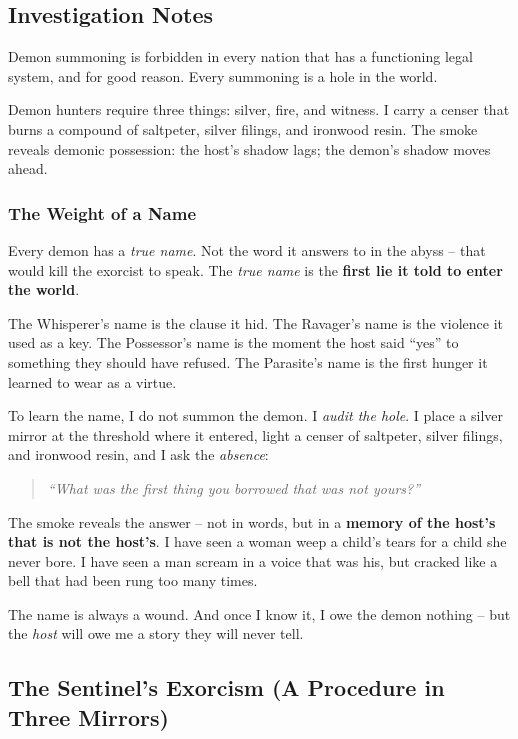 \subsection{Investigation Notes}

Demon summoning is forbidden in every nation that has a functioning legal system, and for good reason. Every summoning is a hole in the world.

Demon hunters require three things: silver, fire, and witness. I carry a censer that burns a compound of saltpeter, silver filings, and ironwood resin. The smoke reveals demonic possession: the host's shadow lags; the demon's shadow moves ahead.

\subsubsection{The Weight of a Name}

Every demon has a \emph{true name}. Not the word it answers to in the abyss -- that would kill the exorcist to speak. The \emph{true name} is the \textbf{first lie it told to enter the world}.  

The Whisperer's name is the clause it hid. The Ravager's name is the violence it used as a key. The Possessor's name is the moment the host said ``yes'' to something they should have refused. The Parasite's name is the first hunger it learned to wear as a virtue.

To learn the name, I do not summon the demon. I \emph{audit the hole}.  
I place a silver mirror at the threshold where it entered, light a censer of saltpeter, silver filings, and ironwood resin, and I ask the \emph{absence}:

\begin{quote}\itshape
``What was the first thing you borrowed that was not yours?''
\end{quote}

The smoke reveals the answer -- not in words, but in a \textbf{memory of the host's that is not the host's}. I have seen a woman weep a child's tears for a child she never bore. I have seen a man scream in a voice that was his, but cracked like a bell that had been rung too many times.

The name is always a wound. And once I know it, I owe the demon nothing -- but the \emph{host} will owe me a story they will never tell.

\subsection{The Sentinel's Exorcism (A Procedure in Three Mirrors)}

